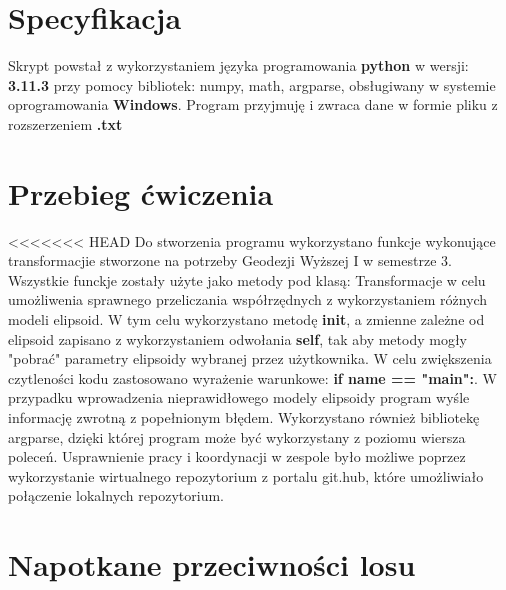 \section{Specyfikacja}

\begin{flushleft}
	\hspace{1cm}Skrypt powstał z wykorzystaniem języka programowania \textbf{python} w wersji: \textbf{3.11.3} przy pomocy bibliotek: numpy, math, argparse, obsługiwany w systemie oprogramowania \textbf{Windows}. Program przyjmuję i zwraca dane w formie pliku z rozszerzeniem \textbf{.txt}
\end{flushleft}

\section{Przebieg ćwiczenia}

\begin{flushleft}
<<<<<<< HEAD
	\hspace{1cm}Do stworzenia programu wykorzystano funkcje wykonujące transformacjie stworzone na potrzeby Geodezji Wyższej I w semestrze 3. Wszystkie funckje zostały użyte jako metody pod klasą: Transformacje w celu umożliwenia sprawnego przeliczania współrzędnych z wykorzystaniem różnych modeli elipsoid. W tym celu wykorzystano metodę \textbf{init}, a zmienne zależne od elipsoid zapisano z wykorzystaniem odwołania \textbf{self}, tak aby metody mogły "pobrać" parametry elipsoidy wybranej przez użytkownika. W celu zwiększenia czytleności kodu zastosowano wyrażenie warunkowe: \textbf{if name == "main":}. W przypadku wprowadzenia nieprawidłowego modely elipsoidy program wyśle informację zwrotną z popełnionym błędem. Wykorzystano również bibliotekę argparse, dzięki której program może być wykorzystany z poziomu wiersza poleceń. Usprawnienie pracy i koordynacji w zespole było możliwe poprzez wykorzystanie wirtualnego repozytorium z portalu git.hub, które umożliwiało połączenie lokalnych repozytorium.
\end{flushleft}

\section{Napotkane przeciwności losu}

